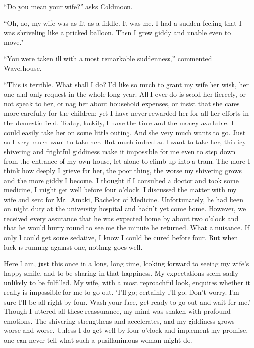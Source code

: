 \documentclass[12pt, openright]{book}
\begin{document}
``Do you mean your wife?'' asks Coldmoon.

``Oh, no, my wife was as fit as a fiddle. It was me. I had a sudden
feeling that I was shriveling like a pricked balloon. Then I grew giddy
and unable even to move.''

``You were taken ill with a most remarkable suddenness,'' commented
Waverhouse.

``This is terrible. What shall I do? I'd like so much to grant my wife
her wish, her one and only request in the whole long year. All I ever do
is scold her fiercely, or not speak to her, or nag her about household
expenses, or insist that she cares more carefully for the children; yet
I have never rewarded her for all her efforts in the domestic field.
Today, luckily, I have the time and the money available. I could easily
take her on some little outing. And she very much wants to go. Just as I
very much want to take her. But much indeed as I want to take her, this
icy shivering and frightful giddiness make it impossible for me even to
step down from the entrance of my own house, let alone to climb up into
a tram. The more I think how deeply I grieve for her, the poor thing,
the worse my shivering grows and the more giddy I become. I thought if I
consulted a doctor and took some medicine, I might get well before four
o'clock. I discussed the matter with my wife and sent for Mr.~Amaki,
Bachelor of Medicine. Unfortunately, he had been on night duty at the
university hospital and hadn't yet come home. However, we received every
assurance that he was expected home by about two o'clock and that he
would hurry round to see me the minute he returned. What a nuisance. If
only I could get some sedative, I know I could be cured before four. But
when luck is running against one, nothing goes well.

Here I am, just this once in a long, long time, looking forward to
seeing my wife's happy smile, and to be sharing in that happiness. My
expectations seem sadly unlikely to be fulfilled. My wife, with a most
reproachful look, enquires whether it really is impossible for me to go
out. `I'll go; certainly I'll go. Don't worry. I'm sure I'll be all
right by four. Wash your face, get ready to go out and wait for me.'
Though I uttered all these reassurance, my mind was shaken with profound
emotions. The shivering strengthens and accelerates, and my giddiness
grows worse and worse. Unless I do get well by four o'clock and
implement my promise, one can never tell what such a pusillanimous woman
might do.
\end{document}
